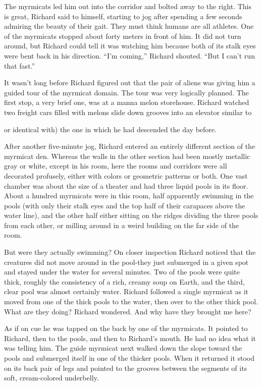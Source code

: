 \documentclass[]{article}
\begin{document}
{The myrmicats led him out into the corridor and bolted away to the right. This is great, Richard said to himself, starting to jog after spending a few seconds admiring the beauty of their gait. They must think humans are all athletes. One of the myrmicats stopped about forty meters in front of him. It did not turn around, but Richard could tell it was watching him because both of its stalk eyes were bent back in his direction. “I’m coming,” Richard shouted. “But I can’t run that fast.”

It wasn’t long before Richard figured out that the pair of aliens was giving him a guided tour of the myrmicat domain. The tour was very logically planned. The first stop, a very brief one, was at a manna melon storehouse. Richard watched two freight cars filled with melons slide down grooves into an elevator similar to {or identical with) the one in which he had descended the day before.
	
After another five-minute jog, Richard entered an entirely different section of the myrmicat den. Whereas the walls in the other section had been mostly metallic gray or white, except in his room, here the rooms and corridors were all decorated profusely, either with colors or geometric patterns or both. One vast chamber was about the size of a theater and had three liquid pools in its floor. About a hundred myrmicats were in this room, half apparently swimming in the pools (with only their stalk eyes and the top half of their carapaces above the water line), and the other half either sitting on the ridges dividing the three pools from each other, or milling around in a weird building on the far side of the room.

But were they actually swimming? On closer inspection Richard noticed that the creatures did not move around in the pool-they just submerged in a given spot and stayed under the water for several minutes. Two of the pools were quite thick, roughly the consistency of a rich, creamy soup on Earth, and the third, clear pool was almost certainly water. Richard followed a single myrmicat as it moved from one of the thick pools to the water, then over to the other thick pool. What are they doing? Richard wondered. And why have they brought me here?

As if on cue he was tapped on the back by one of the myrmicats. It pointed to Richard, then to the pools, and then to Richard’s mouth. He had no idea what it was telling him. The guide myrmicat next walked down the slope toward the pools and submerged itself in one of the thicker pools. When it returned it stood on its back pair of legs and pointed to the grooves between the segments of its soft, cream-colored underbelly.

}}
\end{document}
